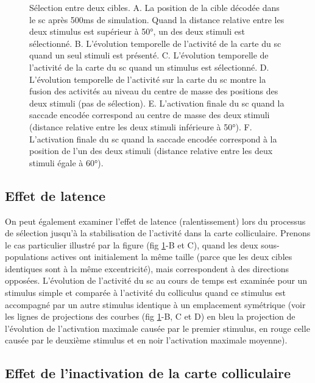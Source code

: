 \begin{figure}
  \caption{Sélection entre deux cibles. A. La position de la cible décodée dans le \protect\gls{sc} après 500ms de simulation. Quand la distance relative entre les deux stimulus est supérieur à 50°, un des deux stimuli est sélectionné. B. L'évolution temporelle de l'activité de la carte du \protect\gls{sc} quand un seul stimuli est présenté. C. L'évolution temporelle de l'activité de la carte du \protect\gls{sc} quand un stimulus est sélectionné. D. L'évolution temporelle de l'activité sur la carte du \protect\gls{sc} montre la fusion des activités au niveau du centre de masse des positions des deux stimuli (pas de sélection). E. L'activation finale du \protect\gls{sc} quand la saccade encodée correspond au centre de masse des deux stimuli (distance relative entre les deux stimuli inférieure à 50°). F. L'activation finale du \protect\gls{sc} quand la saccade encodée correspond à la position de l'un des deux stimuli (distance relative entre les deux stimuli égale à 60°).
  }
  \label{fig: distractor}
\end{figure}


\subsection{Effet de latence}

On peut également examiner l'effet de latence (ralentissement) lors du processus de sélection jusqu'à la stabilisation de l'activité dans la carte colliculaire. Prenons le cas particulier illustré par la figure (fig \ref{fig: distractor}-B et C), quand les deux sous-populations actives ont initialement la même taille (parce que les deux cibles identiques sont à la même excentricité), mais correspondent à des directions opposées. L'évolution de l'activité du \gls{sc} au cours de temps est examinée pour un stimulus simple et comparée à l'activité du colliculus quand ce stimulus est accompagné par un autre stimulus identique à un emplacement symétrique (voir les lignes de projections des courbes (fig \ref{fig: distractor}-B, C et D) en bleu la projection de l'évolution de l'activation maximale causée par le premier stimulus, en rouge celle causée par le deuxième stimulus et en noir l'activation maximale moyenne).

\subsection{Effet de l'inactivation de la carte colliculaire}

